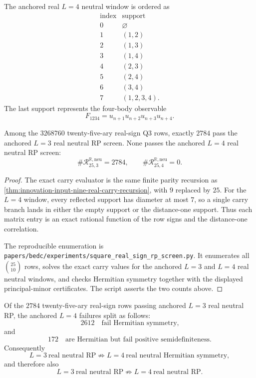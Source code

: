 \begin{definition}[Anchored real $L=4$ neutral window]
\label{def:innovation-input-square-real-lfour-window}
The anchored real $L=4$ neutral window is ordered as
$$
\begin{array}{c|c}
\text{index} & \text{support}\\
\hline
0 & \varnothing\\
1 & (1,2)\\
2 & (1,3)\\
3 & (1,4)\\
4 & (2,3)\\
5 & (2,4)\\
6 & (3,4)\\
7 & (1,2,3,4).
\end{array}
$$
The last support represents the four-body observable
$$
F_{1234}=u_{n+1}u_{n+2}u_{n+3}u_{n+4}.
$$
\end{definition}

\begin{theorem}
\label{thm:innovation-input-twentyfive-real-sign-lfour-exclusion}
Among the $3268760$ twenty-five-ary real-sign Q3 rows, exactly $2784$
pass the anchored $L=3$ real neutral RP screen. None passes the anchored
$L=4$ real neutral RP screen:
$$
\#\mathcal R^{\mathbb R,\mathrm{neu}}_{25,3}=2784,
\qquad
\#\mathcal R^{\mathbb R,\mathrm{neu}}_{25,4}=0.
$$
\end{theorem}

\begin{proof}
The exact carry evaluator is the same finite parity recursion as
\autoref{thm:innovation-input-nine-real-carry-recursion}, with $9$
replaced by $25$. For the $L=4$ window, every reflected support has
diameter at most $7$, so a single carry branch lands in either the empty
support or the distance-one support. Thus each matrix entry is an exact
rational function of the row signs and the distance-one correlation.

The reproducible enumeration is
\texttt{papers/bedc/experiments/square\_real\_sign\_rp\_screen.py}. It
enumerates all $\binom{25}{10}$ rows, solves the exact carry values for the
anchored $L=3$ and $L=4$ real neutral windows, and checks Hermitian
symmetry together with the displayed principal-minor certificates. The
script asserts the two counts above.
\end{proof}

\begin{theorem}
\label{thm:innovation-input-twentyfive-lfour-failure-split}
Of the $2784$ twenty-five-ary real-sign rows passing anchored $L=3$ real
neutral RP, the anchored $L=4$ failures split as follows:
$$
2612
\quad
\text{fail Hermitian symmetry,}
$$
and
$$
172
\quad
\text{are Hermitian but fail positive semidefiniteness.}
$$
Consequently
$$
L=3\ \text{real neutral RP}
\not\Rightarrow
L=4\ \text{real neutral Hermitian symmetry},
$$
and therefore also
$$
L=3\ \text{real neutral RP}
\not\Rightarrow
L=4\ \text{real neutral RP}.
$$
\end{theorem}

